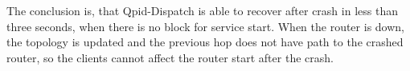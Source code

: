 The conclusion is, that Qpid-Dispatch is able to recover after crash in less than three seconds, when there is no block for service start. When the router is down, the topology is updated and the previous hop does not have path to the crashed router, so the clients cannot affect the router start after the crash.



